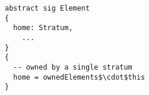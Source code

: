 \lstset{frame=tb, aboveskip=12pt, belowskip=-3pt, breaklines=true, basicstyle=\small\ttfamily, tabsize=2, mathescape=true}
\begin{lstlisting}[caption={structure.als, lines 56-72}, label=alloy:element-home, captionpos=b]
abstract sig Element
{
  home: Stratum,
    ...
}
{
  -- owned by a single stratum
  home = ownedElements$\cdot$this
}
\end{lstlisting}
